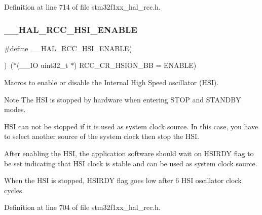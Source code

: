 Definition at line 714 of file stm32f1xx\+\_\+hal\+\_\+rcc.\+h.

\mbox{\label{group___r_c_c___h_s_i___configuration_gaab944f562b53fc74bcc0e4958388fd42}} 
\subsubsection{\texorpdfstring{\+\_\+\+\_\+\+H\+A\+L\+\_\+\+R\+C\+C\+\_\+\+H\+S\+I\+\_\+\+E\+N\+A\+B\+LE}{\_\_HAL\_RCC\_HSI\_ENABLE}}
{\footnotesize\ttfamily \#define \+\_\+\+\_\+\+H\+A\+L\+\_\+\+R\+C\+C\+\_\+\+H\+S\+I\+\_\+\+E\+N\+A\+B\+LE(\begin{DoxyParamCaption}{ }\end{DoxyParamCaption})~($\ast$(\+\_\+\+\_\+\+IO uint32\+\_\+t $\ast$) R\+C\+C\+\_\+\+C\+R\+\_\+\+H\+S\+I\+O\+N\+\_\+\+BB = E\+N\+A\+B\+LE)}



Macros to enable or disable the Internal High Speed oscillator (H\+SI). 

\begin{DoxyNote}{Note}
The H\+SI is stopped by hardware when entering S\+T\+OP and S\+T\+A\+N\+D\+BY modes. 

H\+SI can not be stopped if it is used as system clock source. In this case, you have to select another source of the system clock then stop the H\+SI. 

After enabling the H\+SI, the application software should wait on H\+S\+I\+R\+DY flag to be set indicating that H\+SI clock is stable and can be used as system clock source. 

When the H\+SI is stopped, H\+S\+I\+R\+DY flag goes low after 6 H\+SI oscillator clock cycles. 
\end{DoxyNote}


Definition at line 704 of file stm32f1xx\+\_\+hal\+\_\+rcc.\+h.

